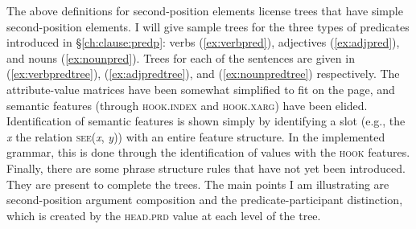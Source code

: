 The above definitions for second-position elements license trees that have simple second-position elements. I will give sample trees for the three types of predicates introduced in \S\ref{ch:clause:predp}: verbs (\ref{ex:verbpred}), adjectives (\ref{ex:adjpred}), and nouns (\ref{ex:nounpred}). Trees for each of the sentences are given in (\ref{ex:verbpredtree}), (\ref{ex:adjpredtree}), and (\ref{ex:nounpredtree}) respectively. The attribute-value matrices have been somewhat simplified to fit on the page, and semantic features (through \textsc{hook.index} and \textsc{hook.xarg}) have been elided. Identification of semantic features is shown simply by identifying a slot (e.g., the \textit{x} the relation \textsc{see}(\textit{x}, \textit{y})) with an entire feature structure. In the implemented grammar, this is done through the identification of values with the \textsc{hook} features. Finally, there are some phrase structure rules that have not yet been introduced. They are present to complete the trees. The main points I am illustrating are second-position argument composition and the predicate-participant distinction, which is created by the \textsc{head.prd} value at each level of the tree. %

